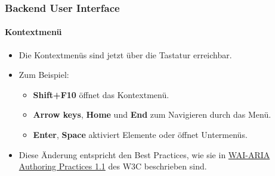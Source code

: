 %

\begin{frame}[fragile]
	\frametitle{Backend User Interface}
	\framesubtitle{Kontextmenü}

	\begin{itemize}
		\item Die Kontextmenüs sind jetzt über die Tastatur erreichbar.
		\item Zum  Beispiel:

			\begin{itemize}\small
				\item \textbf{Shift+F10} öffnet das Kontextmenü.
				\item \textbf{Arrow keys}, \textbf{Home} und \textbf{End} zum Navigieren durch das Menü.
				\item \textbf{Enter}, \textbf{Space} aktiviert Elemente oder öffnet Untermenüs.
			\end{itemize}

		\item Diese Änderung entspricht den Best Practices, wie sie in
			\href{https://www.w3.org/TR/wai-aria-practices-1.1/#keyboard-interaction-12}{WAI-ARIA Authoring Practices 1.1}
			des W3C beschrieben sind.

	\end{itemize}

\end{frame}


